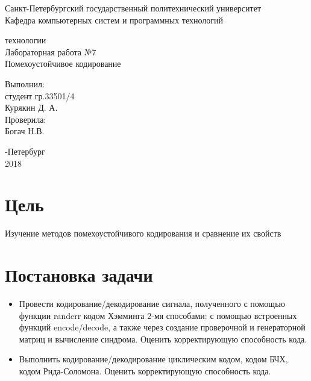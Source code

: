 \documentclass[a4paper,12pt]{article}
\begin{document}
\begin{center}
Санкт-Петербургский государственный политехнический университет
\\Кафедра компьютерных систем и программных технологий
\end{center}
\vspace*{10em plus .6em minus .5em}

\begin{center}
{ технологии
\\Лабораторная работа №7
\\Помехоустойчивое кодирование}
\end{center}

\vspace*{5em plus .6em minus .5em}
\begin{flushright}
Выполнил:\\студент гр.33501/4\\Курякин Д. А.\\Проверила:\\Богач Н.В.
\end{flushright}

\vspace*{15em plus .6em minus .5em}
\begin{center}
{-Петербург
\\2018}
\end{center}
\pagestyle{empty}
\newpage
\pagestyle{plain}


\section{Цель}

Изучение методов помехоустойчивого кодирования и сравнение их свойств

\section{Постановка задачи}

\begin{itemize}
\item Провести кодирование/декодирование сигнала, полученного с помощью функции randerr кодом Хэмминга 2-мя способами: с помощью встроенных функций encode/decode, а также через создание проверочной и генераторной матриц и вычисление синдрома. Оценить корректирующую способность кода.
\item Выполнить кодирование/декодирование циклическим кодом, кодом БЧХ, кодом Рида-Соломона. Оценить корректирующую способность кода.
\end{itemize}
\end{document}
